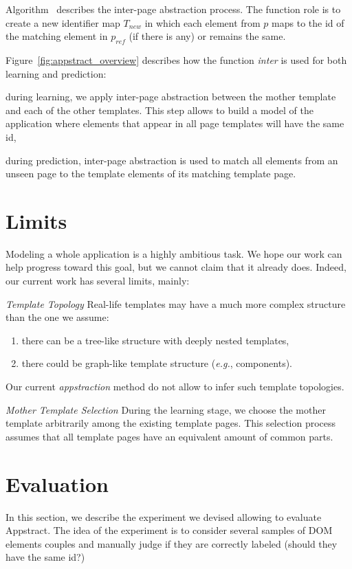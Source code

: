 Algorithm~\label{alg:inter-page} describes the inter-page abstraction process.
The function role is to create a new identifier map $T_{new}$ in which each element from $p$ maps to the id of the matching element in $p_{ref}$ (if there is any) or remains the same.

Figure~\ref{fig:appstract_overview} describes how the function \emph{inter} is used for both learning and prediction:
\begin{compactenum}
    \item during learning, we apply inter-page abstraction between the mother template and each of the other templates. This step allows to build a model of the application where elements that appear in all page templates will have the same id,
    \item during prediction, inter-page abstraction is used to match all elements from an unseen page to the template elements of its matching template page.
\end{compactenum}

\section{Limits}
Modeling a whole application is a highly ambitious task.
We hope our work can help progress toward this goal, but we cannot claim that it already does.
Indeed, our current work has several limits, mainly:

\emph{Template Topology}
Real-life templates may have a much more complex structure than the one we assume:
\begin{enumerate}
\item there can be a tree-like structure with deeply nested templates,
\item there could be graph-like template structure (\emph{e.g.}, components).
\end{enumerate}
Our current \emph{appstraction} method do not allow to infer such template topologies.

\emph{Mother Template Selection}
During the learning stage, we choose the mother template arbitrarily among the existing template pages.
This selection process assumes that all template pages have an equivalent amount of common parts.

\section{Evaluation}\label{sec:evaluation}
In this section, we describe the experiment we devised allowing to evaluate Appstract.
The idea of the experiment is to consider several samples of DOM elements couples and manually judge if they are correctly labeled (should they have the same id?)

